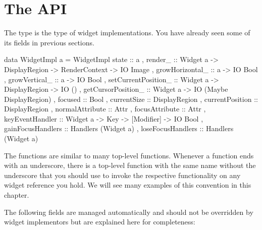 \section{The  API}
\label{sec:widgetimpl_api}

The  type is the type of widget implementations.  You
have already seen some of its fields in previous sections.

\begin{haskellcode}
 data WidgetImpl a = WidgetImpl {
       state :: a
     , render_ :: Widget a -> DisplayRegion -> RenderContext
               -> IO Image
     , growHorizontal_ :: a -> IO Bool
     , growVertical_ :: a -> IO Bool
     , setCurrentPosition_ :: Widget a -> DisplayRegion -> IO ()
     , getCursorPosition_ :: Widget a -> IO (Maybe DisplayRegion)
     , focused :: Bool
     , currentSize :: DisplayRegion
     , currentPosition :: DisplayRegion
     , normalAttribute :: Attr
     , focusAttribute :: Attr
     , keyEventHandler :: Widget a -> Key -> [Modifier] -> IO Bool
     , gainFocusHandlers :: Handlers (Widget a)
     , loseFocusHandlers :: Handlers (Widget a)
     }
\end{haskellcode}

The  functions are similar to many top-level functions.
Whenever a  function ends with an underscore, there is
a top-level function with the same name without the underscore that
you should use to invoke the respective functionality on any widget
reference you hold.  We will see many examples of this convention in
this chapter.

The following fields are managed automatically and should not be
overridden by widget implementors but are explained here for
completeness:

